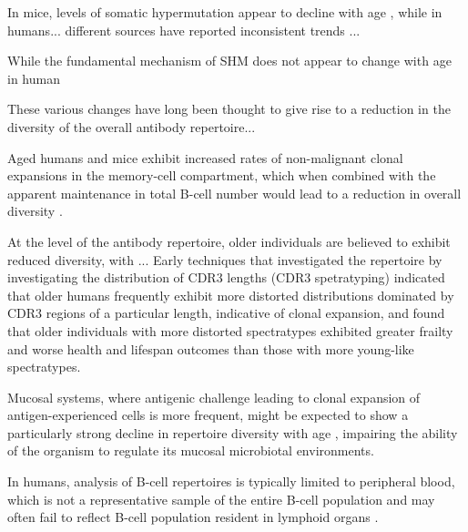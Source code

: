 In mice, levels of somatic hypermutation appear to decline with age \parencite{henry2019influenza}, %
while in humans... %
different sources have reported inconsistent trends \parencite{blomberg2013age}...

While the fundamental mechanism of SHM does not appear to change with age in human






These various changes have long been thought to give rise to a reduction in the diversity of the overall antibody repertoire...

Aged humans \parencite{siegrist2009extremes} and mice \parencite{dunnwalters2010bcellageing} exhibit increased rates of non-malignant clonal expansions in the memory-cell compartment, which when combined with the apparent maintenance in total B-cell number would lead to a reduction in overall diversity \parencite{dunnwalters2010bcellageing}. %

At the level of the antibody repertoire, older individuals are believed to exhibit reduced diversity, with ...
Early techniques that investigated the repertoire by investigating the distribution of CDR3 lengths (CDR3 spetratyping) indicated that older humans frequently exhibit more distorted distributions dominated by CDR3 regions of a particular length, indicative of clonal expansion, and found that older individuals with more distorted spectratypes exhibited greater frailty and worse health and lifespan outcomes than those with more young-like spectratypes. %

Mucosal systems, where antigenic challenge leading to clonal expansion of antigen-experienced cells is more frequent, might be expected to show a particularly strong decline in repertoire diversity with age \parencite{caruso2009immunosenescence}, impairing the ability of the organism to regulate its mucosal microbiotal environments.



In humans, analysis of B-cell repertoires is typically limited to peripheral blood, which is not a representative sample of the entire B-cell population and may often fail to reflect B-cell population resident in lymphoid organs \parencite{siegrist2009extremes}.

